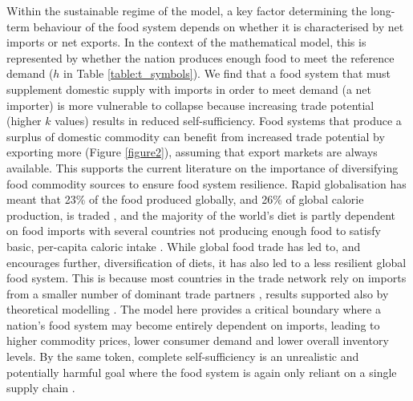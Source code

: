 \documentclass[9pt,twocolumn,twoside,lineno]{pnas-new}
\begin{document}
Within the sustainable regime of the model, a key factor determining the long-term behaviour of the food system depends on whether it is characterised by net imports or net exports. In the context of the mathematical model, this is represented by whether the nation produces enough food to meet the reference demand ($h$ in Table \ref{table:t_symbols}). We find that a food system that must supplement domestic supply with imports in order to meet demand (a net importer) is more vulnerable to collapse because increasing trade potential (higher $k$ values) results in reduced self-sufficiency. Food systems that produce a surplus of domestic commodity can benefit from increased trade potential by exporting more (Figure \ref{figure2}), assuming that export markets are always available. This supports the current literature on the importance of diversifying food commodity sources to ensure food system resilience. Rapid globalisation has meant that 23\% of the food produced globally, and 26\% of global calorie production, is traded \cite{dodorico2014,tu2019,poppy2019}, and the majority of the world's diet is partly dependent on food imports \cite{kummu2020} with several countries not producing enough food to satisfy basic, per-capita caloric intake \cite{dodorico2014}. While global food trade has led to, and encourages further, diversification of diets, it has also led to a less resilient global food system. This is because most countries in the trade network rely on imports from a smaller number of dominant trade partners \cite{kummu2020}, results supported also by theoretical modelling \cite{tu2019}. The model here provides a critical boundary where a nation's food system may become entirely dependent on imports, leading to higher commodity prices, lower consumer demand and lower overall inventory levels. By the same token, complete self-sufficiency is an unrealistic and potentially harmful goal where the food system is again only reliant on a single supply chain \cite{helm2017}.
\end{document}
